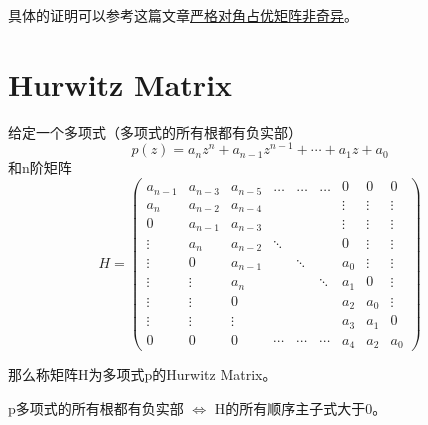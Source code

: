 \documentclass[lang=cn,10pt]{elegantbook}
\begin{document}
具体的证明可以参考这篇文章\href{https://zhuanlan.zhihu.com/p/512029879}{严格对角占优矩阵非奇异}。

\section{Hurwitz Matrix}
\begin{definition}\label{de1.5}
	给定一个多项式（多项式的所有根都有负实部）
	\begin{equation}
		p(z)=a_{n}z^{n}+a_{n-1}z^{n-1}+\cdots+a_{1}z+a_{0}
	\end{equation}
	和n阶矩阵
	\begin{equation}
		H=
		\begin{pmatrix}
			a_{n-1} & a_{n-3} & a_{n-5} & \ldots & \ldots & \ldots & 0      & 0      & 0      \\
			a_n     & a_{n-2} & a_{n-4} &        &        &        & \vdots & \vdots & \vdots \\
			0       & a_{n-1} & a_{n-3} &        &        &        & \vdots & \vdots & \vdots \\
			\vdots  & a_n     & a_{n-2} & \ddots &        &        & 0      & \vdots & \vdots \\
			\vdots  & 0       & a_{n-1} &        & \ddots &        & a_0    & \vdots & \vdots \\
			\vdots  & \vdots  & a_n     &        &        & \ddots & a_{1}  & 0      & \vdots \\
			\vdots  & \vdots  & 0       &        &        &        & a_{2}  & a_0    & \vdots \\
			\vdots  & \vdots  & \vdots  &        &        &        & a_{3}  & a_{1}  & 0      \\
			0       & 0       & 0       & \cdots & \cdots & \cdots & a_{4}  & a_{2}  & a_0
		\end{pmatrix}
	\end{equation}
	\par 那么称矩阵H为多项式p的Hurwitz Matrix。

	p多项式的所有根都有负实部 $\Longleftrightarrow$ H的所有顺序主子式大于0。
\end{definition}
\end{document}
